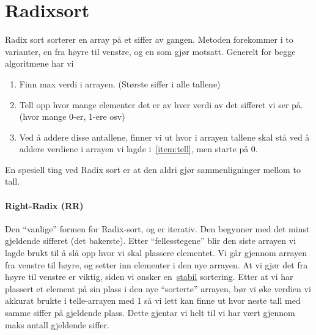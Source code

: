 \section{Radixsort}\label{radixsort}
Radix sort sorterer en array på et siffer av gangen.
Metoden forekommer i to varianter, en fra høyre til venstre, og en som gjør
motsatt. Generelt for begge algoritmene har vi
\begin{enumerate}
\item Finn max verdi i arrayen. (Største siffer i alle tallene)
\item\label{item:tell} Tell opp hvor mange elementer det er av hver verdi av det sifferet vi ser
  på. (hvor mange 0-er, 1-ere osv)
\item Ved å addere disse antallene, finner vi ut hvor i arrayen tallene skal stå
  ved å addere verdiene i arrayen vi lagde i~\ref{item:tell}, men starte på 0.
\end{enumerate}
En spesiell ting ved Radix sort er at den aldri gjør sammenligninger mellom to
tall.

\paragraph{Right-Radix (RR)}
Den ``vanlige'' formen for Radix-sort, og er iterativ.
Den begynner med det minst gjeldende sifferet (det bakerste). Etter
``fellesstegene'' blir den siste arrayen vi lagde brukt til å slå opp hvor vi
skal plassere elementet. Vi går gjennom arrayen fra venstre til høyre, og setter
inn elementer i den nye arrayen. At vi gjør det fra høyre til venstre er viktig,
siden vi ønsker en~\hyperref[stabil]{stabil} sortering. Etter at vi har plassert
et element på sin plass i den nye ``sorterte'' arrayen, bør vi øke verdien vi
akkurat brukte i telle-arrayen med 1 så vi lett kan finne ut hvor neste tall med
samme siffer på gjeldende plass. Dette gjentar vi helt til vi har vært gjennom
maks antall gjeldende siffer.

